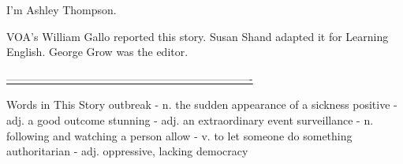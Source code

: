 I'm Ashley Thompson.

VOA's William Gallo reported this story. Susan Shand adapted it for Learning English. George Grow was the editor.

\underline{-------------------------------------------------------------------}

Words in This Story
outbreak - n. the sudden appearance of a sickness
positive - adj. a good outcome
stunning - adj. an extraordinary event
surveillance - n. following and watching a person
allow - v. to let someone do something
authoritarian - adj. oppressive, lacking democracy \newline





